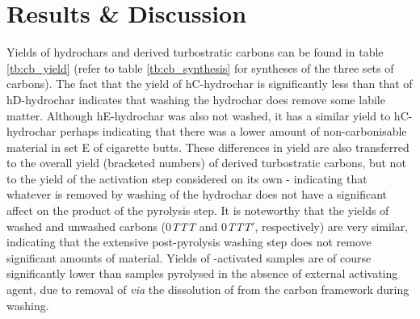 \section{Results \& Discussion}
\label{s:cb_results}

Yields of \glspl{hydrochar} and derived \glspl{turbostratic carbon} can be found in table \ref{tb:cb_yield} (refer to table \ref{tb:cb_synthesis} for syntheses of the three sets of carbons). The fact that the yield of hC-hydrochar is significantly less than that of hD-hydrochar indicates that washing the \gls{hydrochar} does remove some labile matter. Although hE-hydrochar was also not washed, it has a similar yield to hC-hydrochar perhaps indicating that there was a lower amount of non-carbonisable material in set E of cigarette butts. These differences in yield are also transferred to the overall yield (bracketed numbers) of derived \glspl{turbostratic carbon}, but not to the yield of the activation step considered on its own - indicating that whatever is removed by washing of the \gls{hydrochar} does not have a significant affect on the product of the pyrolysis step. It is noteworthy that the yields of washed and unwashed carbons (0\textit{TTT} and 0\textit{TTT}$'$, respectively) are very similar, indicating that the extensive post-pyrolysis washing step does not remove significant amounts of material. Yields of -activated samples are of course significantly lower than samples pyrolysed in the absence of external \gls{activating agent}, due to removal of  \textit{via} the dissolution of  from the carbon framework during washing.


